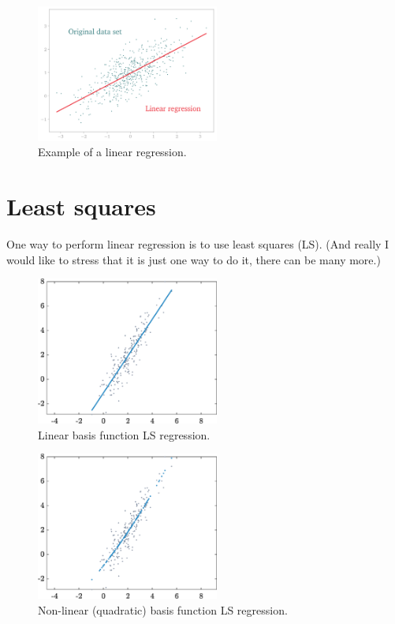 \documentclass[10pt,twocolumn]{article}
\begin{document}
\begin{figure}[H]
\centering\includegraphics[width=6cm]{linear-regression.png}
\caption{Example of a linear regression.}
\label{fig:linear-regression-demo}
\end{figure}



\section{Least squares}

One way to perform linear regression is to use least squares (LS). (And really I would like to stress that it is just one way to do it, there can be many more.)














\begin{figure}[H]
\centering\includegraphics[width=6cm]{LS-linear-basis-functions.eps}
\caption{Linear basis function LS regression.}
\label{fig:LS-linear-basis}
\end{figure}

\begin{figure}[H]
\centering\includegraphics[width=6cm]{LS-nonlinear-basis-functions.eps}
\caption{Non-linear (quadratic) basis function LS regression.}
\label{fig:LS-linear-basis}
\end{figure}
\end{document}
